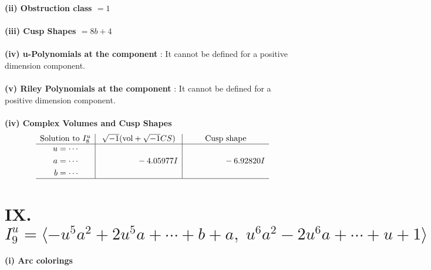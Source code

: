 \documentclass[1p]{elsarticle_modified}
\theoremstyle{definition}
\newcommand{\I}{\sqrt{-1}}
\begin{document}
\flushleft \textbf{(ii) Obstruction class $= 1$}\\~\\
\flushleft \textbf{(iii) Cusp Shapes $= 8 b+4$}\\~\\
\flushleft \textbf{(iv) u-Polynomials at the component} : It cannot be defined for a positive dimension component.\\~\\
\flushleft \textbf{(v) Riley Polynomials at the component} : It cannot be defined for a positive dimension component.\\~\\
\newpage\flushleft \textbf{(iv) Complex Volumes and Cusp Shapes}
$$\begin{array}{c|c|c} 
\text{Solution to }I^u_{8}& \I (\text{vol} + \sqrt{-1}CS) & \text{Cusp shape}\\
 \hline 
\begin{aligned}
u &= \cdots \\
a &= \cdots \\
b &= \cdots\end{aligned}
 & \phantom{-0.000000 } -4.05977 I & \phantom{-0.000000 } -6.92820 I\\
 \hline 
 \end{array}
$$\newpage\renewcommand{\arraystretch}{1}
\centering \section*{IX. $I^u_{9}= \langle - u^5 a^2+2 u^5 a+\cdots+b+a,\;u^6 a^2-2 u^6 a+\cdots+u+1 \rangle$}
\flushleft \textbf{(i) Arc colorings}\\
\end{document}
